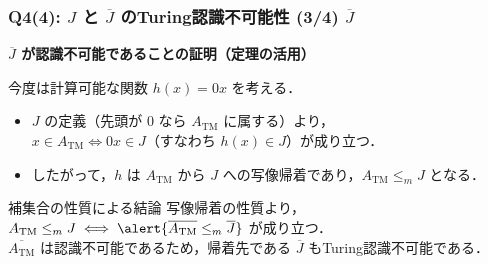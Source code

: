 \begin{frame}[fragile]
\frametitle{Q4(4): $J$ と $\overline{J}$ のTuring認識不可能性 (3/4) $\overline{J}$}

\textbf{$\overline{J}$ が認識不可能であることの証明（定理の活用）}

今度は計算可能な関数 $h(x) = 0x$ を考える．

\begin{itemize}
  \item $J$ の定義（先頭が $0$ なら $A_{\mathrm{TM}}$ に属する）より，\\
  $x \in A_{\mathrm{TM}} \iff 0x \in J$（すなわち $h(x) \in J$）が成り立つ．
  \item したがって，$h$ は $A_{\mathrm{TM}}$ から $J$ への写像帰着であり，\alert{$A_{\mathrm{TM}} \le_m J$} となる．
\end{itemize}

\vspace{1em}
\begin{block}{補集合の性質による結論}
  写像帰着の性質より，$A_{\mathrm{TM}} \le_m J \iff \alert{\overline{A_{\mathrm{TM}}} \le_m \overline{J}}$ が成り立つ．\\
  $\overline{A_{\mathrm{TM}}}$ は認識不可能であるため，帰着先である \alert{$\overline{J}$ もTuring認識不可能}である．
\end{block}
\end{frame}

